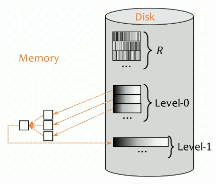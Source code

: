     \begin{figure}[H]
      \centering 
      \includegraphics[scale=0.4]{img/merge.png}
      \caption{} 
      \label{fig:merge}
    \end{figure}

